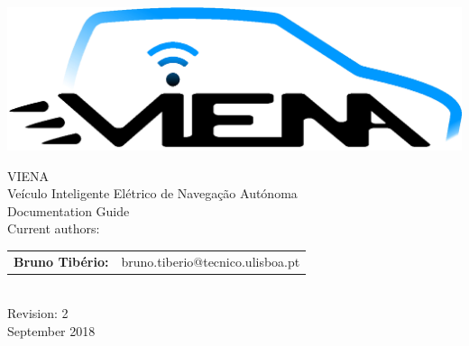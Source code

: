 \begin{center}
%
\vspace{3cm}
\includegraphics[width=0.7\linewidth]{figures/VIENA-Logo.eps}

\vspace{1.0cm}
{\FontLb VIENA} \\ {\FontMn Veículo Inteligente Elétrico de Navegação Autónoma}\\ %
\vspace{0.2cm}
{\FontMn Documentation Guide} \\
\vfill
{\FontMb Current authors:}\\
\begin{tabular}{cl}
	\textbf{Bruno Tibério:} & bruno.tiberio@tecnico.ulisboa.pt \hfill         \\
\end{tabular} 
\\
\vfill
{\FontMb Revision: 2}\\
\vspace{0.5cm}
{\FontMb September 2018} \\
%
\end{center}
